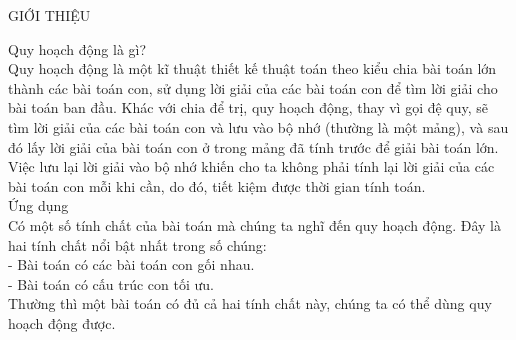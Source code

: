 \documentclass[10pt,a4paper]{article}
\begin{document}
\begin{center}
    \fontsize{30}{30}\selectfont
    GIỚI THIỆU \\
\end{center}

\begin{flushleft}
    \fontsize{14}{20}\selectfont
    Quy hoạch động là gì?\\
    Quy hoạch động là một kĩ thuật thiết kế thuật toán theo kiểu chia bài toán lớn thành các bài toán con, sử dụng lời giải của các bài toán con để tìm lời giải cho bài toán ban đầu. Khác với chia để trị, quy hoạch động, thay vì gọi đệ quy, sẽ tìm lời giải của các bài toán con và lưu vào bộ nhớ (thường là một mảng), và sau đó lấy lời giải của bài toán con ở trong mảng đã tính trước để giải bài toán lớn. Việc lưu lại lời giải vào bộ nhớ khiến cho ta không phải tính lại lời giải của các bài toán con mỗi khi cần, do đó, tiết kiệm được thời gian tính toán.\\
    \vspace{1 cm}
    Ứng dụng\\
    Có một số tính chất của bài toán mà chúng ta nghĩ đến quy hoạch động. Đây là hai tính chất nổi bật nhất trong số chúng:\\
    - Bài toán có các bài toán con gối nhau.\\
    - Bài toán có cấu trúc con tối ưu.\\
    Thường thì một bài toán có đủ cả hai tính chất này, chúng ta có thể dùng quy hoạch động được.\\
\end{flushleft}
\end{document}
